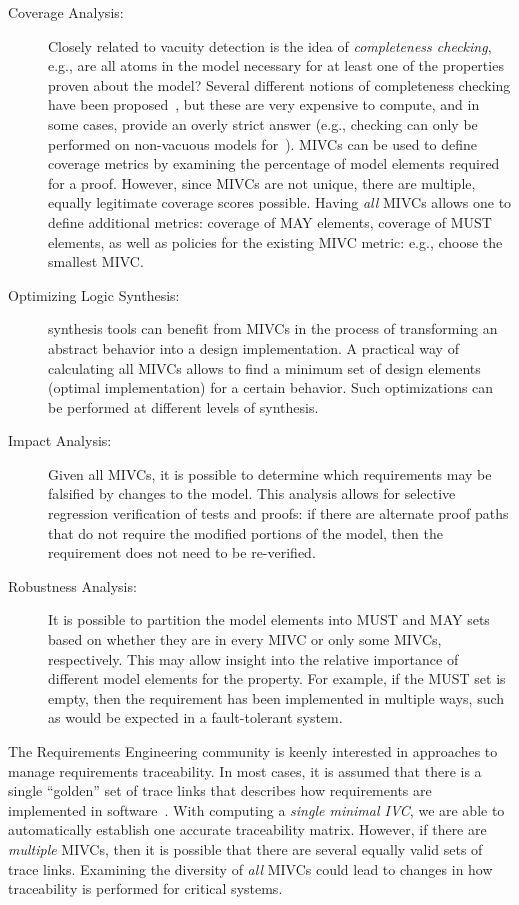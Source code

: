\begin{description}
    \item [Coverage Analysis:] Closely related to vacuity detection is the idea of {\em completeness checking}, e.g., are all atoms in the model necessary for at least one of the properties proven about the model?  Several different notions of completeness checking have been proposed~\cite{chockler_coverage_2003, kupferman_theory_2008}, but these are very expensive to compute, and in some cases, provide an overly strict answer (e.g., checking can only be performed on non-vacuous models for~\cite{kupferman_theory_2008}). MIVCs can be used to define coverage metrics by examining the percentage of model elements required for a proof.  However, since MIVCs are not unique, there are multiple, equally legitimate coverage scores possible.  Having \emph{all} MIVCs allows one to define additional metrics: coverage of MAY elements, coverage of MUST elements, as well as policies for the existing MIVC metric: e.g., choose the smallest MIVC.
    \item [Optimizing Logic Synthesis:]  synthesis tools can benefit from MIVCs in the process of transforming an abstract behavior into a design implementation. A practical way of calculating all MIVCs allows to find a minimum set of design elements (optimal implementation) for a certain behavior. Such optimizations can be performed at different levels of synthesis.
    \item [Impact Analysis:] Given all MIVCs, it is possible to determine which requirements may be falsified by changes to the model.  This analysis allows for selective regression verification of tests and proofs: if there are alternate proof paths that do not require the modified portions of the model, then the requirement does not need to be re-verified.
    \item [Robustness Analysis:] It is possible to partition the model elements into MUST and MAY sets based on whether they are in every MIVC or only some MIVCs, respectively.  This may allow insight into the relative importance of different model elements for the property.  For example, if the MUST set is empty, then the requirement has been implemented in multiple ways, such as would be expected in a fault-tolerant system.
\end{description}

The Requirements Engineering community is keenly interested in approaches to manage requirements traceability.  In most cases, it is assumed that there is a single ``golden'' set of trace links that describes how requirements are implemented in software~\cite{COEST,hayes2003improving,cleland2007best}.
With computing a \emph{single minimal IVC}, we are able to automatically establish one accurate traceability matrix. However, if there are \emph{multiple} MIVCs, then it is possible that there are several equally valid sets of trace links.  Examining the diversity of \emph{all }MIVCs could lead to changes in how traceability is performed for critical systems.


